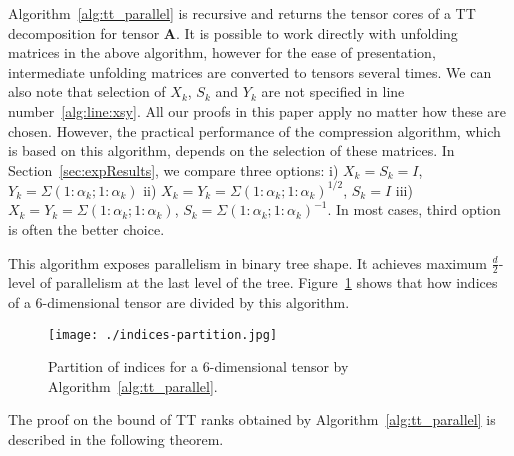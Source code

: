 \documentclass[runningheads]{llncs}
\newcommand{\tensor}[1]{\cal\textbf{#1}\xspace}
\begin{document}
Algorithm~\ref{alg:tt_parallel} is recursive and returns the tensor cores of a TT decomposition for tensor \tensor{A}. It is possible to work directly with unfolding matrices in the above algorithm, however for the ease of presentation, intermediate unfolding matrices are converted to tensors several times. We can also note that selection of $X_k$, $S_k$ and $Y_k$ are not specified in line number~\ref{alg:line:xsy}. All our proofs in this paper apply no matter how these are chosen. However, the practical performance of the compression algorithm, which is based on this algorithm, depends on the selection of these matrices. In Section~\ref{sec:expResults}, we compare three options: i) $X_k=S_k=I$, $Y_k = \Sigma(1:\alpha_k; 1:\alpha_k)$ ii) $X_k = Y_k = \Sigma(1:\alpha_k; 1:\alpha_k)^{1/2}$, $S_k = I$ iii) $X_k = Y_k = \Sigma(1:\alpha_k; 1:\alpha_k)$, $S_k = \Sigma(1:\alpha_k; 1:\alpha_k)^{-1} $. In most cases, third option is often the better choice.

This algorithm exposes parallelism in binary tree shape. It achieves maximum $\frac{d}{2}$-level of parallelism at the last level of the tree. Figure~\ref{fig:4dindices} shows that how indices of a $6$-dimensional tensor are divided by this algorithm.


\begin{figure}[htb]
	\begin{center}
		\texttt{[image: ./indices-partition.jpg]}
	\end{center}
	\caption{\label{fig:4dindices} Partition of indices for a $6$-dimensional tensor by Algorithm~\ref{alg:tt_parallel}.} 
\end{figure}


\noindent The proof on the bound of TT ranks obtained by Algorithm~\ref{alg:tt_parallel} is described in the following theorem.
\end{document}
